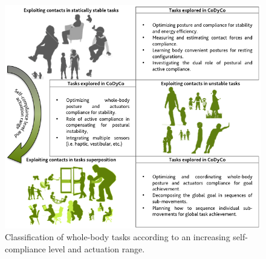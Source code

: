 \documentclass[final,5p,twocolumn]{elsarticle}
\begin{document}
\begin{figure}
\centering
\includegraphics[width=\linewidth]{./images/classification2.png}
\caption{Classification of whole-body tasks according to an increasing self-compliance level and actuation range.}
\label{fig:classification2}
\end{figure}
\end{document}
